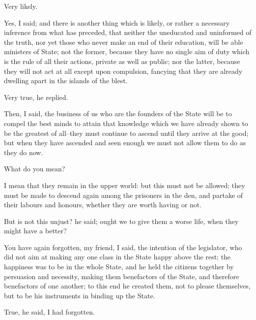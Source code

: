 Very likely.

Yes, I said; and there is another thing which is likely, or rather a
necessary inference from what has preceded, that neither the uneducated
and uninformed of the truth, nor yet those who never make an end of
their education, will be able ministers of State; not the former,
because they have no single aim of duty which is the rule of all their
actions, private as well as public; nor the latter, because they will
not act at all except upon compulsion, fancying that they are already
dwelling apart in the islands of the blest.

Very true, he replied.

Then, I said, the business of us who are the founders of the State
will be to compel the best minds to attain that knowledge which we have
already shown to be the greatest of all--they must continue to ascend
until they arrive at the good; but when they have ascended and seen
enough we must not allow them to do as they do now.

What do you mean?

I mean that they remain in the upper world: but this must not be
allowed; they must be made to descend again among the prisoners in the
den, and partake of their labours and honours, whether they are worth
having or not.

But is not this unjust? he said; ought we to give them a worse life,
when they might have a better?

You have again forgotten, my friend, I said, the intention of the
legislator, who did not aim at making any one class in the State happy
above the rest; the happiness was to be in the whole State, and he
held the citizens together by persuasion and necessity, making them
benefactors of the State, and therefore benefactors of one another;
to this end he created them, not to please themselves, but to be his
instruments in binding up the State.

True, he said, I had forgotten.

